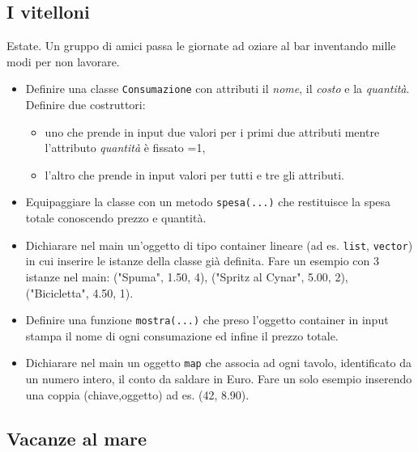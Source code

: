 \documentclass{article}
\begin{document}
\subsection{I vitelloni}
Estate. Un gruppo di amici passa le giornate ad oziare al bar inventando mille modi per non lavorare.
	\begin{itemize}
	\item Definire una classe \texttt{Consumazione} con attributi il \emph{nome}, il \emph{costo} e la \emph{quantit\`a}. Definire due costruttori:
		\begin{itemize}
		\item uno che prende in input due valori per i primi due attributi mentre l'attributo \emph{quantit\`a} \`e fissato =1,
		\item l'altro che prende in input valori per tutti e tre gli attributi.
		\end{itemize}
	\item Equipaggiare la classe con un metodo \texttt{spesa(...)} che restituisce la spesa totale conoscendo prezzo e quantit\`a.
	\item Dichiarare nel main un'oggetto di tipo container lineare (ad es. \texttt{list}, \texttt{vector}) in cui inserire le istanze della classe gi\`a definita. Fare un esempio con 3 istanze nel main: ("Spuma", 1.50, 4), ("Spritz al Cynar", 5.00, 2), ("Bicicletta", 4.50, 1).
	\item Definire una funzione \texttt{mostra(...)} che preso l'oggetto container in input stampa il nome di ogni consumazione ed infine il prezzo totale.
	\item Dichiarare nel main un oggetto \texttt{map} che associa ad ogni tavolo, identificato da un numero intero, il conto da saldare in Euro. Fare un solo esempio inserendo una coppia (chiave,oggetto) ad es. (42, 8.90).
	\end{itemize}
	
	
\subsection{Vacanze al mare}
\end{document}
